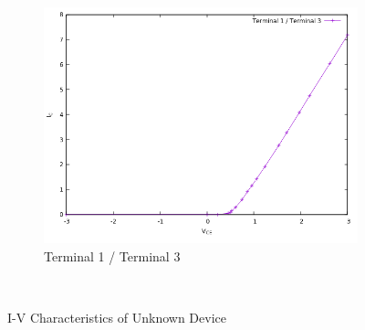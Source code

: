 \documentclass[12pt]{article}
\begin{document}
\begin{figure}[H]
	\begin{center}	
	\begin{subfigure}[b]{\linewidth}
	   	\includegraphics[width = \linewidth, trim = {0 0 0 0}, clip]{IV13.png}
		\caption{Terminal 1 / Terminal 3}
	\end{subfigure}\\
	\end{center}
	\caption{I-V Characteristics of Unknown Device}
\end{figure}
\end{document}
